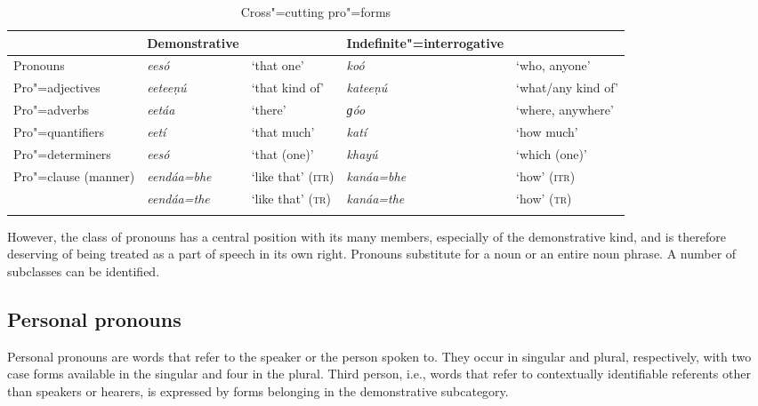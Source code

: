 \begin{table}[ht]
\caption{Cross"=cutting pro"=forms}
\begin{tabularx}{\textwidth}{ Q Q Q Q Q }
\lsptoprule
&
Demonstrative &
&
Indefinite"=interrogative &
\\\hline
Pronouns &
\textit{eesó} &
`that one' &
\textit{koó} &
`who, anyone'\\
Pro"=adjectives &
\textit{eeteeṇú} &
`that kind of' &
\textit{kateeṇú} &
`what/any kind of' \\
Pro"=adverbs &
\textit{eetáa} &
`there' &
\textit{ɡóo} &
`where, anywhere' \\
Pro"=quantifiers &
\textit{eetí} &
`that much' &
\textit{katí} &
`how much' \\
Pro"=determiners &
\textit{eesó} &
`that (one)' &
\textit{khayú} &
`which (one)' \\
Pro"=clause (manner) &
\textit{eendáa=bhe} &
`like that' (\textsc{itr}) &
\textit{kanáa=bhe} &
`how' (\textsc{itr}) \\
&
\textit{eendáa=the} &
`like that' (\textsc{tr}) &
\textit{kanáa=the} &
`how' (\textsc{tr}) \\\lspbottomrule
\end{tabularx}
\label{tab:3b-1}
\end{table}


However, the class of pronouns has a central position with its many members, especially of the demonstrative kind, and is therefore deserving of being treated as a part of speech in its own right. Pronouns substitute for a noun or an entire noun phrase. A number of subclasses can be identified.


\subsection{Personal pronouns}
\label{subsec:3b-6-1}
Personal pronouns are words that refer to the speaker or the person spoken to. They occur in singular and plural, respectively, with two case forms available in the singular and four in the plural. Third person, i.e., words that refer to contextually identifiable referents other than speakers or hearers, is expressed by forms belonging in the demonstrative subcategory.


